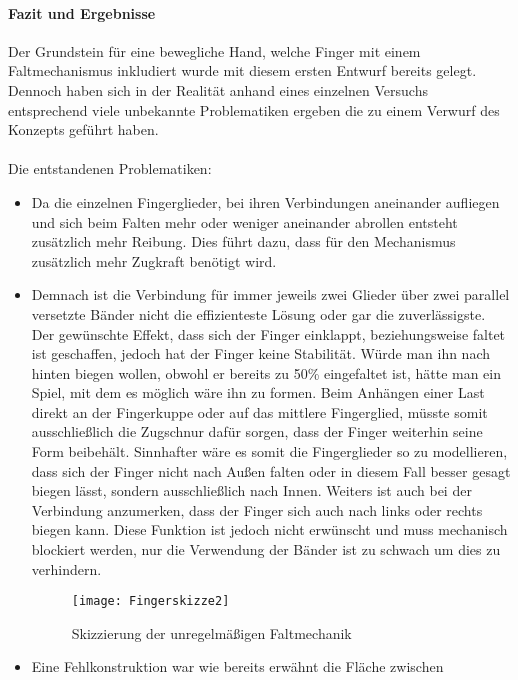 \documentclass[titlepage,12pt,twoside]{article}
\begin{document}
\paragraph{Fazit und Ergebnisse}
\label{par:Fazit und Ergebnisse}
\hfill \break
\hfill \break
Der Grundstein für eine bewegliche Hand, welche Finger mit einem 
Faltmechanismus inkludiert wurde mit diesem ersten Entwurf bereits gelegt. 
Dennoch haben sich in der Realität anhand eines einzelnen Versuchs 
entsprechend viele unbekannte Problematiken ergeben die zu einem Verwurf des 
Konzepts geführt haben. \\
\\
Die entstandenen Problematiken:
\begin{itemize}
	\item Da die einzelnen Fingerglieder, bei ihren Verbindungen aneinander 
	aufliegen und sich beim Falten mehr oder weniger aneinander abrollen 
	entsteht zusätzlich mehr Reibung. Dies führt dazu, dass für den Mechanismus 
	zusätzlich mehr Zugkraft benötigt wird.
	\item Demnach ist die Verbindung für immer jeweils zwei Glieder über zwei 
	parallel versetzte Bänder nicht die effizienteste Lösung oder gar die zuverlässigste. 
	Der gewünschte Effekt, dass sich der Finger einklappt, beziehungsweise 
	faltet ist geschaffen, jedoch hat der Finger keine Stabilität. Würde man 
	ihn nach hinten biegen wollen, obwohl er bereits zu 50\% eingefaltet ist, 
	hätte man ein Spiel, mit dem es möglich wäre ihn zu formen. Beim Anhängen 
	einer Last direkt an der Fingerkuppe oder auf das mittlere Fingerglied, 
	müsste somit ausschließlich die Zugschnur dafür sorgen, dass der Finger 
	weiterhin seine Form beibehält. Sinnhafter wäre es somit die Fingerglieder 
	so zu modellieren, dass sich der Finger nicht nach Außen falten oder in 
	diesem Fall besser gesagt biegen lässt, sondern ausschließlich nach Innen. 
	Weiters ist auch bei der Verbindung anzumerken, dass der Finger sich auch 
	nach links oder rechts biegen kann. Diese Funktion ist jedoch nicht 
	erwünscht und muss mechanisch blockiert werden, nur die Verwendung der 
	Bänder ist zu schwach um dies zu verhindern.
	\begin{figure}[H]
		\begin{center}
			\scalebox{1.2}
			{\texttt{[image: Fingerskizze2]}}
			\caption{Skizzierung der unregelmäßigen Faltmechanik}
			\label{fig:Fingerskizze2}			
		\end{center}
	\end{figure}
	\hfill \break
	\item Eine Fehlkonstruktion war wie bereits erwähnt die Fläche zwischen 

\end{itemize}
\end{document}
